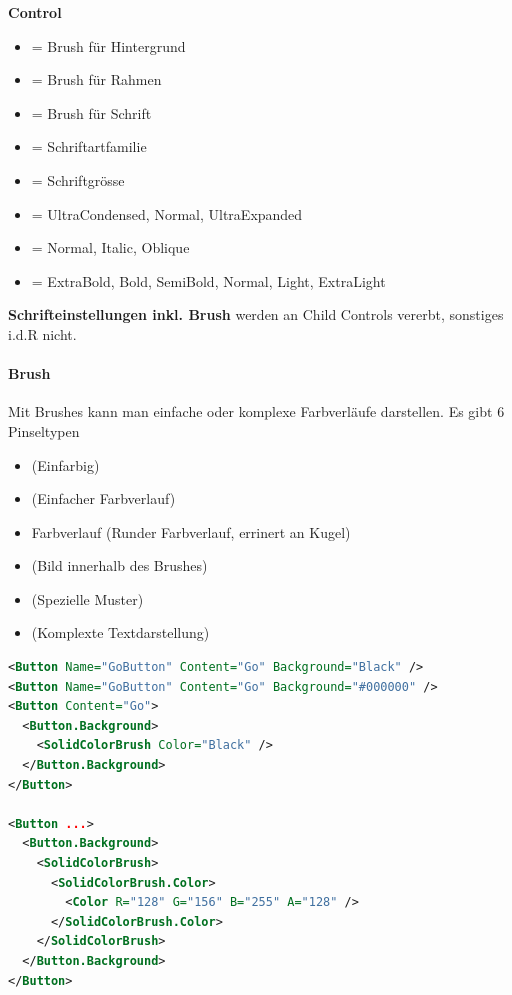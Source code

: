 \textbf{Control}
\begin{itemize}
    \item {} = Brush für Hintergrund
    \item {} = Brush für Rahmen
    \item {} = Brush für Schrift
    \item {} = Schriftartfamilie
    \item {} = Schriftgrösse
    \item {} = UltraCondensed, Normal, UltraExpanded
    \item {} = Normal, Italic, Oblique
    \item {} = ExtraBold, Bold, SemiBold, Normal, Light, ExtraLight
\end{itemize}
\textbf{Schrifteinstellungen inkl. Brush} werden an Child Controls vererbt, sonstiges i.d.R nicht.


\paragraph{Brush} Mit Brushes kann man einfache oder komplexe Farbverläufe darstellen. Es gibt 6 Pinseltypen
\begin{itemize}
    \item {} (Einfarbig)
    \item {} (Einfacher Farbverlauf)
    \item {} Farbverlauf (Runder Farbverlauf, errinert an Kugel)
    \item {} (Bild innerhalb des Brushes)
    \item {} (Spezielle Muster)
    \item {} (Komplexte Textdarstellung)
\end{itemize}

\begin{lstlisting}[language=xml]
<Button Name="GoButton" Content="Go" Background="Black" />
<Button Name="GoButton" Content="Go" Background="#000000" />
<Button Content="Go">
  <Button.Background>
    <SolidColorBrush Color="Black" />
  </Button.Background>
</Button>

<Button ...>
  <Button.Background>
    <SolidColorBrush>
      <SolidColorBrush.Color>
        <Color R="128" G="156" B="255" A="128" />
      </SolidColorBrush.Color>
    </SolidColorBrush>
  </Button.Background>
</Button> 
\end{lstlisting}

